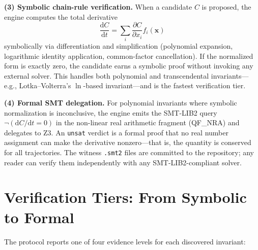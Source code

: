 \textbf{(3) Symbolic chain-rule verification.} When a candidate $C$ is proposed, the engine computes the total derivative
\begin{equation}
\frac{\mathrm{d}C}{\mathrm{d}t} = \sum_i \frac{\partial C}{\partial x_i} f_i(\mathbf{x})
\end{equation}
symbolically via differentiation and simplification (polynomial expansion, logarithmic identity application, common-factor cancellation). If the normalized form is exactly zero, the candidate earns a symbolic proof without invoking any external solver. This handles both polynomial and transcendental invariants---e.g., Lotka--Volterra's $\ln$-based invariant---and is the fastest verification tier.

\textbf{(4) Formal SMT delegation.} For polynomial invariants where symbolic normalization is inconclusive, the engine emits the SMT-LIB2 query $\neg(\mathrm{d}C/\mathrm{d}t = 0)$ in the non-linear real arithmetic fragment (QF\_NRA) and delegates to Z3. An \texttt{unsat} verdict is a formal proof that no real number assignment can make the derivative nonzero---that is, the quantity is conserved for all trajectories. The witness \texttt{.smt2} files are committed to the repository; any reader can verify them independently with any SMT-LIB2-compliant solver.

\section{Verification Tiers: From Symbolic to Formal}

The protocol reports one of four evidence levels for each discovered invariant:

